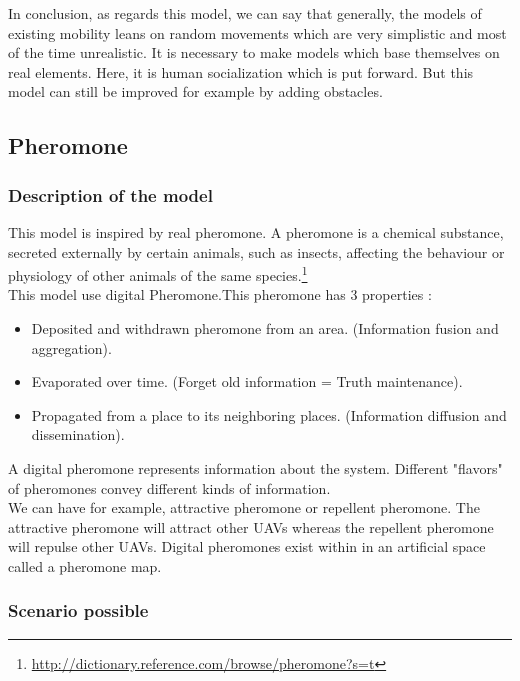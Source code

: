 In conclusion, as regards this model, we can say that generally, the models of existing mobility leans on random movements which are very simplistic and most of the time unrealistic. It is necessary to make models which base themselves on real elements. Here, it is human socialization which is put forward. But this model can still be improved for example by adding obstacles.

\newpage

\subsection{Pheromone}

\subsubsection{Description of the model}

This model is inspired by real pheromone. A pheromone is a chemical substance, secreted externally by certain animals, such as insects, affecting the behaviour or physiology of other animals of the same species.\footnote{\url{http://dictionary.reference.com/browse/pheromone?s=t}}\\
This model use digital Pheromone.This pheromone has 3 properties :

\begin{itemize}
\item  Deposited and withdrawn pheromone from an area. (Information fusion and aggregation).
\item  Evaporated over time. (Forget old information = Truth maintenance).
\item  Propagated from a place to its neighboring places. (Information diffusion and dissemination). 
\end{itemize}

A  digital  pheromone  represents  information  about  the  system. Different  "flavors"  of  pheromones convey different kinds of information.\\ We can have for example, attractive pheromone or repellent pheromone. The attractive pheromone will attract other UAVs whereas the repellent pheromone will repulse other UAVs. Digital pheromones exist within in an artificial space called a pheromone map.

\newpage

\subsubsection{Scenario possible}

